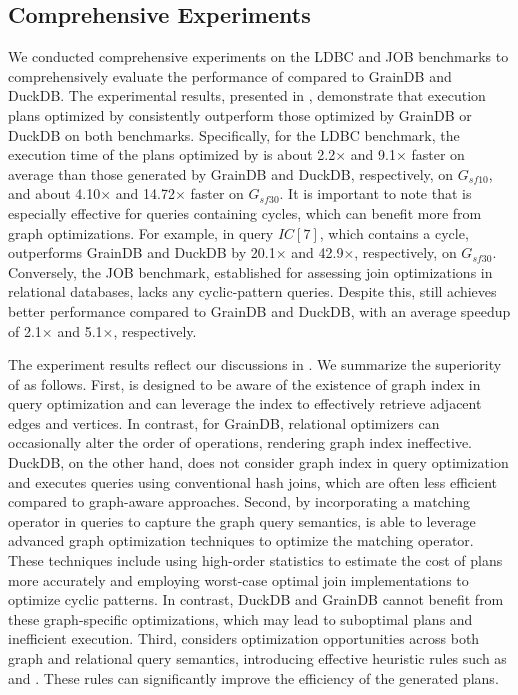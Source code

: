 \subsection{Comprehensive Experiments}
\label{sec:experiment-e2e}


We conducted comprehensive experiments on the LDBC and JOB benchmarks to comprehensively evaluate the performance of \name compared to GrainDB and DuckDB. The experimental results, presented in , demonstrate that execution plans optimized by \name consistently outperform those optimized by GrainDB or DuckDB on both benchmarks.
Specifically, for the LDBC benchmark, the execution time of the plans optimized by \name is about 2.2$\times$ and 9.1$\times$ faster on average than those generated by GrainDB and DuckDB, respectively, on $G_{sf10}$, and about 4.10$\times$ and 14.72$\times$ faster on $G_{sf30}$. It is important to note that \name is especially effective for queries containing cycles, which can benefit more from graph optimizations. For example, in query $IC[7]$, which contains a cycle, \name outperforms GrainDB and DuckDB by 20.1$\times$ and 42.9$\times$, respectively, on $G_{sf30}$.
Conversely, the JOB benchmark, established for assessing join optimizations in relational databases, lacks any cyclic-pattern queries. Despite this, \name still achieves better performance compared to GrainDB and DuckDB, with an average speedup of 2.1$\times$ and 5.1$\times$, respectively.

\enlargethispage{1em}

The experiment results reflect our discussions in . We summarize the superiority of \name as follows.
First, \name is designed to be aware of the existence of graph index in query optimization and can leverage the index to effectively retrieve adjacent edges and vertices. In contrast, for GrainDB, relational optimizers can occasionally alter the order of \EVjoin operations, rendering graph index ineffective. DuckDB, on the other hand, does not consider graph index in query optimization and executes queries using conventional hash joins, which are often less efficient compared to graph-aware approaches.
Second, by incorporating a matching operator in \spjm queries to capture the graph query semantics, \name is able to leverage advanced graph optimization techniques to optimize the matching operator. These techniques include using high-order statistics to estimate the cost of plans more accurately and employing worst-case optimal join implementations to optimize cyclic patterns. In contrast, DuckDB and GrainDB cannot benefit from these graph-specific optimizations, which may lead to suboptimal plans and inefficient execution.
Third, \name considers optimization opportunities across both graph and relational query semantics, introducing effective heuristic rules such as \filterrule and \joinfuserule. These rules can significantly improve the efficiency of the generated plans.

